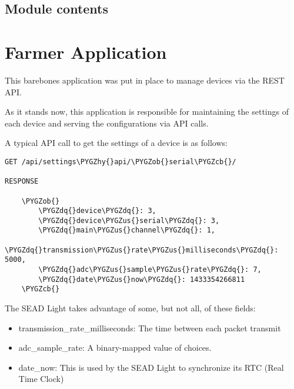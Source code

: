 \documentclass[letterpaper,10pt,english]{sphinxmanual}
\def\PYGZus{\char`\_}
\def\PYGZob{\char`\{}
\def\PYGZcb{\char`\}}
\def\PYGZhy{\char`\-}
\def\PYGZdq{\char`\"}
\begin{document}

\begin{fulllineitems}
\label{modules/debug:debug.views.influxgen}
\end{fulllineitems}



\subsection{Module contents}
\label{modules/debug:module-contents}\label{modules/debug:module-debug}

\section{Farmer Application}
\label{modules/farmer:farmer-application}\label{modules/farmer::doc}
This barebones application was put in place to manage devices via the
REST API.

As it stands now, this application is responsible for maintaining the
settings of each device and serving the configurations via API calls.

A typical API call to get the settings of a device is as follows:

\begin{Verbatim}[commandchars=\\\{\}]
GET /api/settings\PYGZhy{}api/\PYGZob{}serial\PYGZcb{}/

RESPONSE

    \PYGZob{}
        \PYGZdq{}device\PYGZdq{}: 3,
        \PYGZdq{}device\PYGZus{}serial\PYGZdq{}: 3,
        \PYGZdq{}main\PYGZus{}channel\PYGZdq{}: 1,
        \PYGZdq{}transmission\PYGZus{}rate\PYGZus{}milliseconds\PYGZdq{}: 5000,
        \PYGZdq{}adc\PYGZus{}sample\PYGZus{}rate\PYGZdq{}: 7,
        \PYGZdq{}date\PYGZus{}now\PYGZdq{}: 1433354266811
    \PYGZcb{}
\end{Verbatim}

The SEAD Light takes advantage of some, but not all, of these fields:
\begin{itemize}
\item {} 
transmission\_rate\_milliseconds: The time between each packet transmit

\item {} 
adc\_sample\_rate: A binary-mapped value of choices.

\item {} 
date\_now: This is used by the SEAD Light to synchronize its RTC (Real Time Clock)

\end{itemize}
\end{document}
